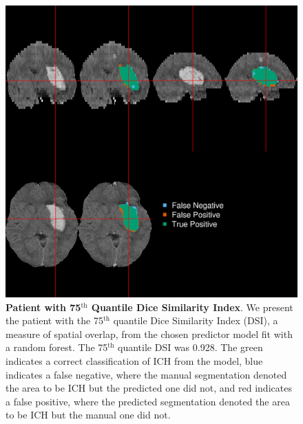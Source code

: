 \documentclass{elsarticle_nonatbib}\usepackage[]{graphicx}\usepackage[]{color}
\begin{document}
 \begin{figure}
\centering
\includegraphics[width=0.75\linewidth,keepaspectratio]{Reseg_Figure_DSI_Quantile_075_native.png}
\caption{{\bf Patient with  75$^{\text{th}}$ Quantile Dice Similarity Index}. We present the patient with the 75$^{\text{th}}$ quantile Dice Similarity Index (DSI), a measure of spatial overlap, from the chosen predictor model fit with a random forest.  The 75$^{\text{th}}$ quantile DSI was 0.928. The green indicates a correct classification of ICH from the model, blue indicates a false negative, where the manual segmentation denoted the area to be ICH but the predicted one did not, and red indicates a false positive, where the predicted segmentation denoted the area to be ICH but the manual one did not. }
\label{fig:dice_img0}
\end{figure}
\end{document}
